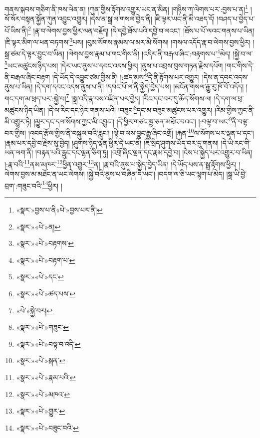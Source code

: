 གནས་སྐབས་གཅིག་ནི་ཁས་ལེན་ན། །ཀུན་གྱིས་རྟོགས་འགྱུར་ཡང་ན་མིན། །གཉིས་ཀ་ལེགས་པར་:བྱས་པ་ན།\footnote{«སྣར་»བྱས་པ་ནི«པེ་»བྱས་པར་ནི།} །སོ་སོར་བསྟན་སྐྱོན་ཀུན་འབྱུང་འགྱུར། །དེས་ན་སྒྲ་ལ་གསལ་བྱེད་ནི། །ཇི་ལྟར་ཡང་ནི་མི་འཐད་དོ། །བཤད་པ་བྱེད་པ་པོ་ཡིས་ནི།\footnote{«སྣར་»«པེ་»ན།} །རྣ་བ་ལེགས་བྱས་ཕྱིར་ལན་བརྗོད། །དེ་དབྱེ་ཐོས་པའི་དབྱེ་བ་ལའང་། །ཐོས་པ་པོ་ལའང་གནས་པ་ཡིན། །ཇི་ལྟར་མིག་ལ་ཕན་བཏགས་\footnote{«སྣར་»«པེ་»བརྟགས་}པས། །བུམ་སོགས་རྣམས་ལ་མར་མེ་སོགས། །གསལ་འདོད་རྣ་བ་ལེགས་བྱས་ཕྱིར། །སྒྲ་ཙམ་དེ་ལྟར་བྱུང་བ་ཡིན། །ལེགས་བྱས་རྣམ་པ་གང་གིས་ནི། །འདིར་ནི་བརྒལ་ཞིང་:བརྟགས་པ་\footnote{«སྣར་»«པེ་»བརྟག་པ་}མེད། །སྐྱེ་བ་ལ་\footnote{«སྣར་»«པེ་»དང་}ཡང་མཚུངས་ཉིད་པས། །དེར་ཡང་ནུས་པ་དབང་འདས་ཕྱིར། །ནུས་པ་འབྲས་བུས་གཏན་རྗེས་དཔོག །གང་གིས་དེ་ནི་བརྒལ་ཞིང་བརྟག །དེ་ཡོད་དེ་འབྱུང་ཙམ་གྱིས་ནི། །:ཚད་མས་\footnote{«སྣར་»«པེ་»ཚད་པས་}དེ་ནི་རྟོགས་པར་འགྱུར། །དེས་ན་དབང་འདས་ནུས་པ་ཡིན། །དེ་དག་དབང་འདས་ནུས་པ་ནི། །དབང་པོ་ལ་ནི་སྐྱེད་བྱེད་པས། །མངོན་གསལ་རྒྱུ་རུ་ཁོ་བོ་འདོད། །གང་དག་མ་ཕྲད་པར་:སྐྱེ་བ།\footnote{«པེ་»སྐྱེ་བར།} །སྒྲ་འདི་རྣ་བས་འཛིན་པར་བྱེད། །རིང་དང་བར་དུ་ཆོད་སོགས་ལ། །དེ་དག་ལ་ཕྲ་མཚུངས་ཉིད་ཡིན། །དེ་ལ་རིང་དང་ཉེར་གནས་པའི། །བཟུང་\footnote{«སྣར་»«པེ་»གཟུང་}དང་མ་བཟུང་མཚུངས་པར་འགྱུར། །རིམ་གྱིས་ཀྱང་ནི་མི་འགྱུར་ཏེ། །མྱུར་དང་དལ་སོགས་ཀྱང་མི་འབྱུང་། །དེ་ཕྱིར་གཙང་སྦྲ་ཅན་མཐོང་བའང་། །:བལྟ་བ་ཡང་\footnote{«སྣར་»«པེ་»བལྟ་བ་འདི་}ནི་བལྟ་བར་གྱིས། །འབད་རྩོལ་གྱིས་ནི་བསྐུལ་བའི་རླུང་། །ལྟེ་བ་ལས་བྱུང་རྒྱུ་ཞིང་འགྲོ། །རྐན་\footnote{«སྣར་»«པེ་»སྐན་}ལ་སོགས་པར་ལྡན་པ་དང་། །རྣམ་པར་དབྱེ་བ་རྗེས་སུ་བྱེད། །ཤུགས་ཉིད་ལྡན་ཕྱིར་དེ་ཡང་ནི། །ཇི་སྲིད་ཤུགས་ཡོད་བར་དུ་གནས། །དེ་ཡི་རང་གི་ཡན་ལག་ནི། །བརྟན་པའི་རླུང་དང་ལྷན་ཅིག་ཏུ། །འགྲོ་ཞིང་ལྡན་དང་རྣམ་དབྱེ་བ། །ངེས་པ་སྐྱེད་པར་འགྱུར་བ་ཡིན། །:རྣ་བའི་\footnote{«སྣར་»«པེ་»རྣམ་པའི་}ནམ་མཁར་\footnote{«སྣར་»«པེ་»མཁའ་}ཕྱིན་འགྱུར་\footnote{«སྣར་»«པེ་»གྱུར་}ན། །རྣ་བའི་ནུས་པ་སྐྱེད་བྱེད་ཡིན། །དེ་ཡོད་པས་ན་སྒྲ་རྟོགས་ཕྱིར། །ལེགས་བྱས་མ་མཐོང་ན་ཡང་ལེགས། །སྐྱེ་བའི་ནུས་པ་བཞིན་དེ་ཡང་། །བདག་ལ་ཅི་ཡང་ལྷག་པ་མེད། །སྒྲ་ཡི་བྱེ་བྲག་:གཟུང་བའི་\footnote{«སྣར་»«པེ་»བཟུང་བའི་}ཕྱིར། །
